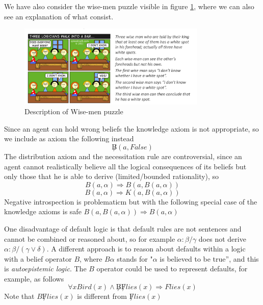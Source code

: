 We have also consider the wise-men puzzle visible in figure \ref{img:wisemen}, where
we can also see an explanation of what consist.

\begin{figure}
	\includegraphics[width=0.8\textwidth]{Images/wiseman}
	\caption{Description of Wise-men puzzle}
	\label{img:wisemen}
\end{figure}
Since an agent can hold wrong beliefs the knowledge axiom is not appropriate, so 
we include as axiom the following instead
\[ \not B(a, False) \]
The distribution axiom and the necessitation rule are controversial, since an agent
cannot realistically believe all the logical consequences of its beliefs but
only those that he is able to derive (limited/bounded rationality), so 
\[ B(a, \alpha) \Rightarrow B(a, B(a, \alpha)) \]
\[ B(a, \alpha) \Rightarrow K(a, B(a, \alpha)) \]
Negative introspection is problematicm but with the following special case of
the knowledge axioms is safe $B(a, B(a, \alpha)) \Rightarrow B(a, \alpha)$

One disadvantage of default logic is that default rules are not sentences and
cannot be combined or reasoned about, so for example $\alpha: \beta / \gamma$
does not derive $\alpha: \beta / (\gamma \lor \delta)$.\newline
A different approach is to reason about defaults within a logic with a belief
operator $B$, where $B\alpha$ stands for "$\alpha$ is believed to be true”, and this
is \emph{autoepistemic logic}.\newline
The $B$ operator could be used to represent defaults, for example, as follows
\[ \forall x Bird(x) \land \not B \not Flies(x) \Rightarrow Flies(x) \]
Note that $B \not Flies(x)$ is different from $\not Flies(x)$

